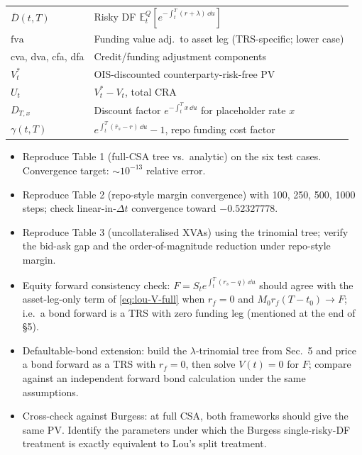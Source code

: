 \documentclass[11pt,a4paper]{article}
\begin{document}
\begin{tabular}{@{}p{3cm}p{12cm}@{}}
$\overline D(t, T)$ & Risky DF $\mathbb{E}^Q_t[e^{-\int_t^T (r + \lambda)\,\dd u}]$ \\
$\mathrm{fva}$    & Funding value adj.\ to asset leg (TRS-specific; lower case) \\
cva, dva, cfa, dfa & Credit/funding adjustment components \\
$V^*_t$           & OIS-discounted counterparty-risk-free PV \\
$U_t$             & $V^*_t - V_t$, total CRA \\
$D_{T, x}$        & Discount factor $e^{-\int_t^T x\,\dd u}$ for placeholder rate $x$ \\
$\gamma(t, T)$    & $e^{\int_t^T (\overline r_s - r)\,\dd u} - 1$, repo funding cost factor \\
\bottomrule
\end{tabular}

\begin{todobox}
\begin{itemize}[noitemsep]
  \item Reproduce Table 1 (full-CSA tree vs.\ analytic) on the six
        test cases. Convergence target: $\sim 10^{-13}$ relative
        error.
  \item Reproduce Table 2 (repo-style margin convergence) with 100,
        250, 500, 1000 steps; check linear-in-$\Delta t$ convergence
        toward $-0.52327778$.
  \item Reproduce Table 3 (uncollateralised XVAs) using the
        trinomial tree; verify the bid-ask gap and the order-of-magnitude
        reduction under repo-style margin.
  \item Equity forward consistency check: $F = S_t e^{\int_t^T (r_s - q)\,\dd u}$
        should agree with the asset-leg-only term of
        \eqref{eq:lou-V-full} when $r_f = 0$ and $M_0 r_f (T - t_0) \to F$;
        i.e.\ a bond forward is a TRS with zero funding leg
        (mentioned at the end of \S 5).
  \item Defaultable-bond extension: build the $\lambda$-trinomial tree
        from Sec.\ 5 and price a bond forward as a TRS with
        $r_f = 0$, then solve $V(t) = 0$ for $F$; compare against an
        independent forward bond calculation under the same
        assumptions.
  \item Cross-check against Burgess: at full CSA, both frameworks
        should give the same PV. Identify the parameters under which
        the Burgess single-risky-DF treatment is exactly equivalent
        to Lou's split treatment.
\end{itemize}
\end{todobox}
\end{document}
